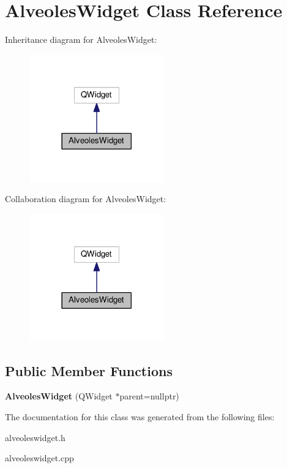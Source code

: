 \hypertarget{classAlveolesWidget}{}\section{Alveoles\+Widget Class Reference}
\label{classAlveolesWidget}


Inheritance diagram for Alveoles\+Widget\+:
\nopagebreak
\begin{figure}[H]
\begin{center}
\leavevmode
\includegraphics[width=165pt]{classAlveolesWidget__inherit__graph}
\end{center}
\end{figure}


Collaboration diagram for Alveoles\+Widget\+:
\nopagebreak
\begin{figure}[H]
\begin{center}
\leavevmode
\includegraphics[width=165pt]{classAlveolesWidget__coll__graph}
\end{center}
\end{figure}
\subsection*{Public Member Functions}
\begin{DoxyCompactItemize}
\item 
{\bfseries Alveoles\+Widget} (Q\+Widget $\ast$parent=nullptr)\hypertarget{classAlveolesWidget_a1f0023fc1fc22fcdaae62d740f9f63c7}{}\label{classAlveolesWidget_a1f0023fc1fc22fcdaae62d740f9f63c7}

\end{DoxyCompactItemize}


The documentation for this class was generated from the following files\+:\begin{DoxyCompactItemize}
\item 
alveoleswidget.\+h\item 
alveoleswidget.\+cpp\end{DoxyCompactItemize}
